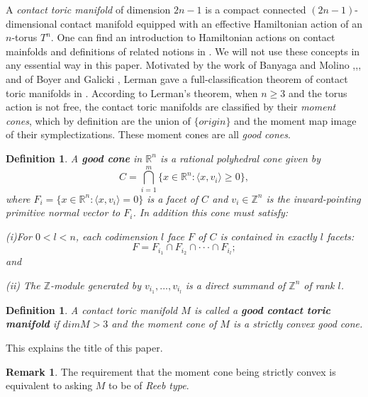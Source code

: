 \documentclass[12pt]{amsart}
\newtheorem{definition}[theorem]{Definition}
\theoremstyle{definition}
\newtheorem{remark}[theorem]{Remark}
\numberwithin{equation}{section}
\begin{document}
 A {\em contact toric manifold} of dimension
$2n-1$ is a compact connected $(2n-1)$-dimensional contact manifold
equipped with an effective Hamiltonian action of an $n$-torus $T^n$.
One can find an introduction to Hamiltonian actions on contact
mainfolds and definitions of related notions in \cite{L:contact
toric}. We will not use these concepts in any essential way in this
paper. Motivated by the work of Banyaga and Molino
\cite{BnM1},\cite{BnM2},\cite{Banyaga}, and of Boyer and Galicki
\cite{BoyG}, Lerman gave a full-classification theorem of contact
toric manifolds in \cite{L:contact toric}. According to Lerman's
theorem, when $n\geq 3$ and the torus action is not free, the
contact toric manifolds are classified by their {\it moment cones},
which by definition are the union of $\{origin\}$ and the moment map
image of their symplectizations. These moment cones are all {\it
good cones}.
\begin{definition}\label{def:good cone}
 A {\bf good cone} in ${{\mathbb{R}}}^n$ is a rational polyhedral cone given by
\begin{equation}
C= \bigcap_{i=1}^{m}\{x\in {{\mathbb{R}}}^n: \langle x, v_{i}\rangle \geq 0\},
\end{equation}
where $F_{i}=\{x\in {{\mathbb{R}}}^n: \langle x,v_{i} \rangle=0\}$ is a facet of
$C$ and $v_{i}\in {{\mathbb{Z}}}^n$ is the inward-pointing primitive normal
vector to $F_{i}$. In addition this cone must satisfy:

(i)For $0<l<n$, each codimension $l$ face $F$ of $C$ is contained in
exactly $l$ facets:
\begin{equation*}
F=F_{i_{1}}\cap F_{i_{2}}\cap{{\cdot\cdot\cdot}}\cap F_{i_{l}};
\end{equation*}
and

(ii) The ${{\mathbb{Z}}}$-module generated by $v_{i_{1}},...,v_{i_{l}}$ is a
direct summand of ${{\mathbb{Z}}}^n$ of rank $l$.
\end{definition}

\begin{definition}\label{def:good contact toric manifolds}
A contact toric manifold $M$ is called a {\bf good contact toric
manifold} if $dim M > 3$ and the moment cone of $M$ is a strictly
convex good cone.
\end{definition}

This explains the title of this paper.

\begin{remark}
The requirement that the moment cone being strictly convex is
equivalent to asking $M$ to be of {\em Reeb type}.
\end{remark}
\end{document}
